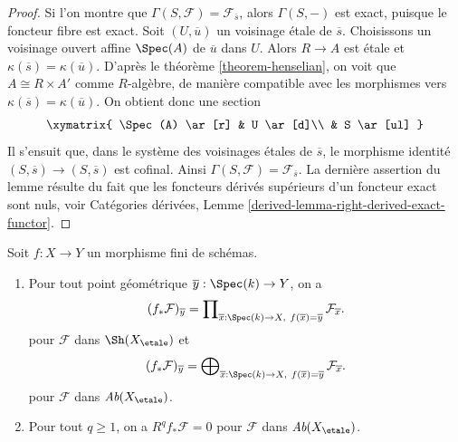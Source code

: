 \begin{proof}
Si l'on montre que $\Gamma(S, \mathcal{F}) = \mathcal{F}_{\overline{s}}$,
alors $\Gamma(S, -)$ est exact, puisque le foncteur fibre est exact.
Soit $(U, \overline{u})$ un voisinage \'etale de $\overline{s}$.
Choisissons un voisinage ouvert affine $\Spec(A)$ de $\overline{u}$ dans $U$.
Alors $R \to A$ est \'etale et $\kappa(\overline{s}) = \kappa(\overline{u})$.
D'apr\`es le th\'eor\`eme \ref{theorem-henselian}, on voit que $A \cong R \times A'$
comme $R$-alg\`ebre, de mani\`ere compatible avec les morphismes vers
$\kappa(\overline{s}) = \kappa(\overline{u})$.
On obtient donc une section
$$
\xymatrix{
\Spec(A) \ar[r] & U \ar[d]\\
& S \ar[ul]
}
$$
Il s'ensuit que, dans le syst\`eme des voisinages \'etales de $\overline{s}$,
le morphisme identit\'e $(S, \overline{s}) \to (S, \overline{s})$ est cofinal.
Ainsi $\Gamma(S, \mathcal{F}) = \mathcal{F}_{\overline{s}}$.
La derni\`ere assertion du lemme r\'esulte du fait que les foncteurs d\'eriv\'es sup\'erieurs
d'un foncteur exact sont nuls, voir
Cat\'egories d\'eriv\'ees, Lemme \ref{derived-lemma-right-derived-exact-functor}.
\end{proof}

\begin{proposition}
\label{proposition-finite-higher-direct-image-zero}
Soit $f : X \to Y$ un morphisme fini de sch\'emas.
\begin{enumerate}
\item Pour tout point g\'eom\'etrique $\overline{y} : \Spec(k) \to Y$, on a
$$
(f_*\mathcal{F})_{\overline{y}} =
\prod\nolimits_{\overline{x} : \Spec(k) \to X,\ f(\overline{x}) =
\overline{y}} \mathcal{F}_{\overline{x}}.
$$
pour $\mathcal{F}$ dans $\Sh(X_\etale)$ et
$$
(f_*\mathcal{F})_{\overline{y}} =
\bigoplus\nolimits_{\overline{x} : \Spec(k) \to X,\ f(\overline{x}) =
\overline{y}} \mathcal{F}_{\overline{x}}.
$$
pour $\mathcal{F}$ dans $\textit{Ab}(X_\etale)$.
\item Pour tout $q \geq 1$, on a $R^q f_*\mathcal{F} = 0$
pour $\mathcal{F}$ dans $\textit{Ab}(X_\etale)$.
\end{enumerate}
\end{proposition}

